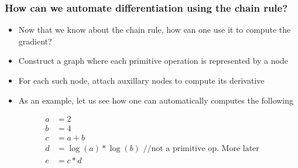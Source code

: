 \documentclass{beamer}
\theoremstyle{plain} %
\theoremstyle{example} %
\begin{document}
\begin{frame}
    \frametitle{How can we automate differentiation using the chain rule?}
    \begin{itemize}
        \item  Now that we know about the chain rule, how can one use it to compute the gradient?
        \item Construct a graph where each primitive operation is represented by a node
        \item For each such node, attach auxillary nodes to compute its derivative
        \item As an example, let us see how one can automatically computes the following
    \end{itemize}
   
\begin{align*}
    a&=2\\
    b&=4\\
    c&=a+b\\
    d&=\log(a)*\log(b) \text{  //not a primitive op. More later}\\
    e&=c*d
\end{align*}    

\end{frame}
\end{document}

